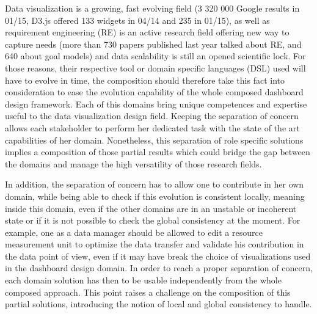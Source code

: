 \documentclass{acm_proc_article-sp}
\begin{document}
Data visualization is a growing, fast evolving field
(3 320 000 Google results in 01/15,
D3.js offered 133 widgets in 04/14 and 235 in 01/15),
as well as requirement engineering (RE) is an active research field
offering new way to capture needs (more than 730 papers published
last year talked about RE, and 640 about goal models)
and data scalability is still an opened scientific lock.
For those reasons, their respective tool or domain
specific languages (DSL) used will have to evolve in time, the composition
should therefore take this fact into consideration to ease the evolution
capability of the whole composed dashboard design framework.
Each of this domains bring unique competences and expertise useful to
the data visualization design field. Keeping the separation of concern
allows each stakeholder to perform her dedicated task with the state of the art
capabilities of her domain.
Nonetheless, this separation of role specific solutions implies a composition
of those partial results which could bridge the gap between the domains and
manage the high versatility of those research fields.

In addition, the separation of concern has to allow one to contribute
in her own domain, while being able to check if this evolution is
consistent locally, meaning inside this domain, even if the other domains
are in an unstable or incoherent state or if it is not possible to check
the global consistency at the moment. For example, one as a data manager
should be allowed to edit a resource measurement unit to optimize the data
transfer and validate his contribution in the data point of view,
even if it may have break the choice of visualizations used in the dashboard
design domain.
In order to reach a proper separation of concern, each domain solution 
has then to be usable independently from the whole composed approach.
This point raises a challenge on the composition of this partial solutions,
introducing the notion of local and global consistency to handle.
\end{document}
